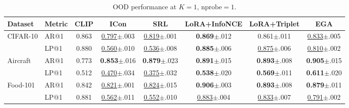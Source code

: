 \documentclass{article}
\begin{document}
\begin{table}[!t]
	\centering
	\caption{OOD performance at $K=1$, $\text{nprobe}=1$.
	}
	\label{tab:ood_summary}
	\small
	\setlength{\tabcolsep}{3pt}
	\begin{tabular}{llcccccc}
		\toprule
		Dataset             & Metric        & CLIP  & ICon                                    & SRL                                     & LoRA+InfoNCE                            & LoRA+Triplet                            & EGA                                     \\
		\midrule
		\multirow{2}{*}{CIFAR-10}
		                    & AR@1          & 0.863 & \underline{0.797}{\scriptsize$\pm$.003} & \underline{0.819}{\scriptsize$\pm$.001} & \textbf{0.869}{\scriptsize$\pm$.012}    & 0.861{\scriptsize$\pm$.011}             & \underline{0.833}{\scriptsize$\pm$.005} \\
		                    & LP@1          & 0.880 & \underline{0.560}{\scriptsize$\pm$.010} & \underline{0.536}{\scriptsize$\pm$.008} & \textbf{0.885}{\scriptsize$\pm$.006}    & \underline{0.875}{\scriptsize$\pm$.006} & \underline{0.810}{\scriptsize$\pm$.002} \\
		\midrule
		\multirow{2}{*}{Aircraft}
		                    & AR@1          & 0.773 & \textbf{0.853}{\scriptsize$\pm$.016}    & \textbf{0.879}{\scriptsize$\pm$.023}    & \textbf{0.891}{\scriptsize$\pm$.015}    & \textbf{0.893}{\scriptsize$\pm$.008}    & \textbf{0.905}{\scriptsize$\pm$.015}    \\
		                    & LP@1          & 0.512 & \underline{0.470}{\scriptsize$\pm$.034} & \underline{0.375}{\scriptsize$\pm$.032} & \textbf{0.538}{\scriptsize$\pm$.020}    & \textbf{0.569}{\scriptsize$\pm$.011}    & \textbf{0.611}{\scriptsize$\pm$.020}    \\
		\midrule
		\multirow{2}{*}{Food-101}
		                    & AR@1          & 0.842 & \underline{0.821}{\scriptsize$\pm$.001} & \underline{0.824}{\scriptsize$\pm$.015} & \textbf{0.906}{\scriptsize$\pm$.003}    & \textbf{0.893}{\scriptsize$\pm$.008}    & \textbf{0.879}{\scriptsize$\pm$.011}    \\
		                    & LP@1          & 0.881 & \underline{0.562}{\scriptsize$\pm$.011} & \underline{0.552}{\scriptsize$\pm$.010} & \underline{0.883}{\scriptsize$\pm$.004} & \underline{0.833}{\scriptsize$\pm$.007} & \underline{0.791}{\scriptsize$\pm$.002} \\

\end{tabular}
\end{table}
\end{document}
